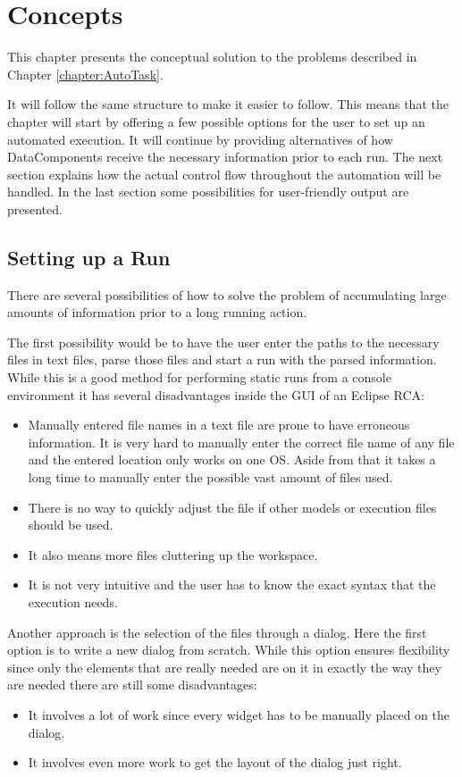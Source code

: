 \chapter{Concepts}
\label{section:AutoConcepts}
This chapter presents the conceptual solution to the problems described in Chapter \ref{chapter:AutoTask}.

It will follow the same structure to make it easier to follow. This means that the chapter will start
by offering a few possible options for the user to set up an automated execution. It will continue
by providing alternatives of how DataComponents receive the necessary information prior to each run.
The next section explains how the actual control flow throughout the automation will be handled.
In the last section some possibilities for user-friendly output are presented.

\section{Setting up a Run}
\label{section:AutoConceptsSetup}
There are several possibilities of how to solve the problem of accumulating
large amounts of information prior to a long running action.

The first possibility would be to have the user enter the paths to the 
necessary files in text files, parse those files and start a run with
the parsed information. While this is a good method for performing
static runs from a console environment it has several disadvantages
inside the \ac{GUI} of an Eclipse \ac{RCA}:
\begin{itemize}
 \item Manually entered file names in a text file are prone to have erroneous information.
It is very hard to manually enter the correct file name of any file and the entered location
only works on one \ac{OS}. Aside from that it takes a long time to manually enter the possible vast
amount of files used.
 \item There is no way to quickly adjust the file if other models or execution files should be used.
 \item It also means more files cluttering up the workspace.
 \item It is not very intuitive and the user has to know the exact syntax that the execution needs.
\end{itemize}

Another approach is the selection of the files through a dialog.
Here the first option is to write a new dialog from scratch. While this option
ensures flexibility since only the elements that are really needed are on it in
exactly the way they are needed there are still some disadvantages:
\begin{itemize}
 \item It involves a lot of work since every widget has to be manually placed on the dialog.
 \item It involves even more work to get the layout of the dialog just right.
\end{itemize}

